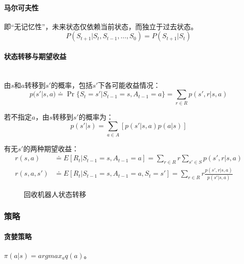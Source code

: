 \documentclass[
12pt, %
a4paper, 
oneside, %
headinclude,footinclude, %
]{scrartcl}
\begin{document}
\paragraph{马尔可夫性}
即“无记忆性”，未来状态仅依赖当前状态，而独立于过去状态。
$$ P(S_{t + 1}|S_t, S_{t - 1}, \dots, S_0) = P(S_{t + 1}|S_t) $$
\paragraph{状态转移与期望收益}~\\

由$ s $和$ a $转移到$ s' $的概率，包括$ s' $下各可能收益情况：
$$ p(s'|s, a) \doteq \Pr\{S_t = s'|S_{t - 1} = s, A_{t - 1} = a\} = \sum_{r \in R} p(s', r|s, a) $$

若不指定$ a $，由$ s $转移到$ s' $的概率为：
$$ p(s'|s) = \sum_{a \in A} [p(s'|s, a)p(a|s)] $$

有无$ s' $的两种期望收益：
\begin{align*}
r(s, a) &\doteq E[R_t|S_{t - 1} = s, A_{t - 1} = a] = \sum_{r \in R} r \sum_{s' \in S} p(s', r|s, a) \\
r(s, a, s') &\doteq E[R_t|S_{t - 1} = s, A_{t - 1} = a, S_t = s'] = \sum_{r \in R} r \frac{p(s', r|s, a)}{p(s'|s, a)}  
\end{align*}

\begin{figure}[H]
\centering
{} \quad
{}
\caption[回收机器人状态转移]{回收机器人状态转移}
\end{figure}
\subsubsection[策略]{策略}
\paragraph{贪婪策略}
$ \pi(a|s) = argmax_a q(a) $。
\end{document}

